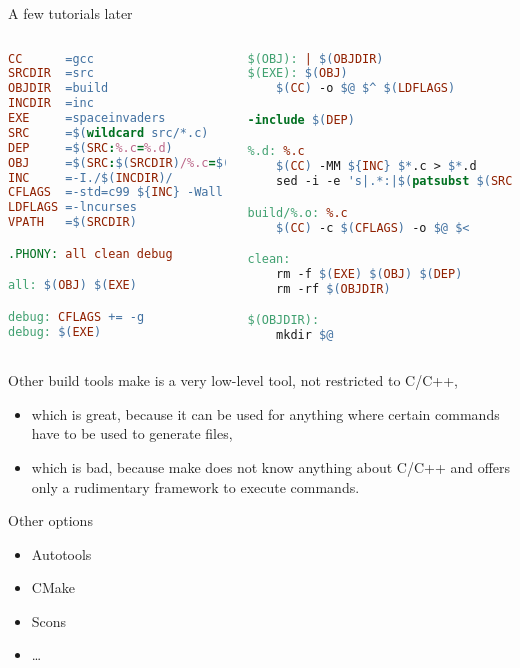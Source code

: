 \begin{frame}[fragile = singleslide]{A few tutorials later}
	\begin{columns}
	\begin{lstlisting}[language=make,basicstyle=\tiny,escapeinside=§]
CC		=gcc
SRCDIR 	=src
OBJDIR	=build
INCDIR	=inc
EXE		=spaceinvaders
SRC 	=$(wildcard src/*.c)
DEP		=$(SRC:%.c=%.d)
OBJ		=$(SRC:$(SRCDIR)/%.c=$(OBJDIR)/%.o)
INC		=-I./$(INCDIR)/
CFLAGS	=-std=c99 ${INC} -Wall -Wextra -Wpedantic -Werror
LDFLAGS	=-lncurses
VPATH 	=$(SRCDIR)

.PHONY: all clean debug

all: $(OBJ) $(EXE)

debug: CFLAGS += -g
debug: $(EXE)
\end{lstlisting}
	\begin{lstlisting}[language=make,basicstyle=\tiny,escapeinside=§,firstnumber=20]
$(OBJ): | $(OBJDIR)
$(EXE): $(OBJ)
	$(CC) -o $@ $^ $(LDFLAGS)

-include $(DEP)

%.d: %.c
	$(CC) -MM ${INC} $*.c > $*.d
	sed -i -e 's|.*:|$(patsubst $(SRCDIR)/%,$(OBJDIR)/%,$*).o:|' $*.d

build/%.o: %.c
	$(CC) -c $(CFLAGS) -o $@ $<

clean:
	rm -f $(EXE) $(OBJ) $(DEP)
	rm -rf $(OBJDIR)

$(OBJDIR):
	mkdir $@
\end{lstlisting}
	\end{columns}
\end{frame}

\begin{frame}{Other build tools}
	make is a very low-level tool, not restricted to C/C++,
	\begin{itemize}
	  \item which is great, because it can be used for anything where certain commands have to be used to generate files,
	  \item which is bad, because make does not know anything about C/C++ and offers only a rudimentary framework to execute commands.
	\end{itemize}

	Other options
	\begin{itemize}
	  \item Autotools
	  \item CMake
	  \item Scons
	  \item …
	\end{itemize}
\end{frame}

